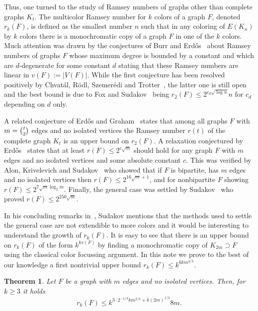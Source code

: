 \documentclass[reqno]{amsart}
\newtheorem{theorem}                   {Theorem}%
\theoremstyle{remark}
\begin{document}
Thus,  one turned to the study of Ramsey numbers of graphs other than complete graphs $K_t$. 
The multicolor Ramsey number for $k$ colors of a graph $F$, denoted $r_k(F)$, is defined as the smallest number $n$ such that in any coloring of $E(K_n)$  by $k$ colors there is 
a monochromatic copy of a graph $F$ in one of the $k$ colors. Much attention was drawn by the conjectures of Burr and Erd\H{o}s~\cite{BurErd75} about Ramsey numbers of graphs $F$ whose maximum degree is 
bounded by a constant and which are $d$-degenerate for some constant $d$ stating that these Ramsey numbers are linear in $v(F):=|V(F)|$.
 While the first conjecture has been resolved positively by Chvat\'al, R\"odl, Szemer\'edi and Trotter~\cite{CRST83}, the latter one is still open 
and the best bound is due to Fox and Sudakov~\cite{FoxSud09BE} being $r_2(F)\le 2^{c_d\sqrt{\log n}}n$ for $c_d$ depending on $d$ only.  

A related conjecture of Erd\H{o}s and Graham~\cite{ErdGra75}  states that among all graphs $F$ with $m=\tbinom{t}{2}$ edges 
and no isolated vertices  
 the Ramsey number $r(t)$ of the complete graph $K_t$ is an upper bound on $r_2(F)$.  
A relaxation conjectured by Erd\H{o}s~\cite{ChuGra98} states that at least $r(F)\le 2^{c\sqrt{m}}$ should hold for any graph $F$ with $m$ edges and no isolated vertices and some absolute constant $c$. 
This was verified by  Alon, Krivelevich and Sudakov~\cite{AKS03} who showed that if $F$ is bipartite, has $m$ edges and  no isolated vertices then 
 $r(F)\le 2^{16\sqrt{m}+1}$, 
and for nonbipartite $F$  showing $r(F)\le 2^{7\sqrt{m}\log_2 m}$. Finally, the general case was settled by Sudakov~\cite{Sud11} who proved $r(F)\le 2^{250\sqrt{m}}$.

In his concluding remarks in~\cite{Sud11}, Sudakov mentions that the methods used to settle the 
general case are not extendible to more colors and it would be interesting to understand 
the growth of $r_k(F)$. It is easy to see that there is an upper bound on $r_k(F)$ of the form $k^{k v(F)}$  by 
finding a monochromatic copy of $K_{2m}\supset F$ using the classical color focussing argument.
 In this note we prove to the best of our knowledge a first nontrivial upper bound  $r_k(F)\le k^{6km^{2/3}}$.
\begin{theorem}\label{thm:multi}
 Let $F$ be a graph with $m$ edges and no isolated vertices. Then, for $k\ge 3$  it holds  
\[
 r_k(F)\le k^{3 \cdot2^{-1/3}km^{2/3}+k(2m)^{1/3}}8m. %
\]
\end{theorem}
\end{document}
